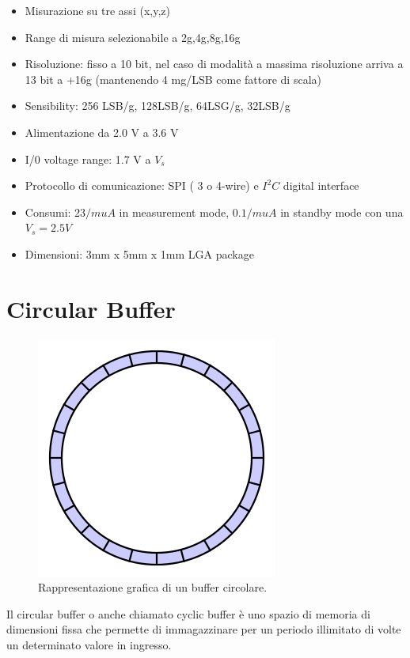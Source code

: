 \documentclass[LaM,binding=0.6cm,oneside]{../sapthesis}
\begin{document}
\begin{itemize}
    \item Misurazione su tre assi (x,y,z)
     
    \item Range di misura selezionabile a 2g,4g,8g,16g
    
    \item Risoluzione: fisso a 10 bit, nel caso di modalità a massima risoluzione arriva a 13 bit a          +16g (mantenendo 4 mg/LSB come fattore di scala) 
    
    \item Sensibility: 256 LSB/g, 128LSB/g, 64LSG/g, 32LSB/g

     \item Alimentazione da 2.0 V  a 3.6 V

     \item I/0 voltage range: 1.7 V a $V_s$

     \item Protocollo di comunicazione: SPI ( 3 o 4-wire) e $I^2C$ digital interface

     \item Consumi: $23 /mu A$ in measurement mode, $0.1 /mu A$ in standby mode con una $V_s = 2.5V$

     \item Dimensioni: 3mm x 5mm x 1mm LGA package
\end{itemize}



\section{Circular Buffer}
\begin{figure}[htbp]
\centerline{\includegraphics[scale=0.5]{examples/CircularBuffer.PNG}}
\caption{Rappresentazione grafica di un buffer circolare.}
\label{fig}
\end{figure}
\newline
Il circular buffer o anche chiamato cyclic buffer è uno spazio di memoria di dimensioni fissa che permette di immagazzinare per un periodo illimitato di volte un determinato valore in ingresso.
\end{document}
